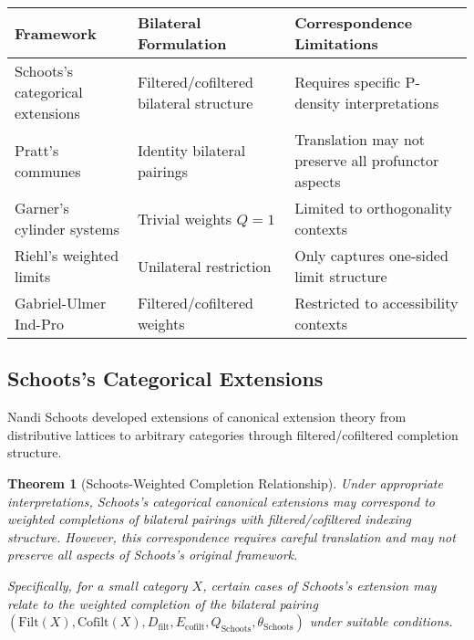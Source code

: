 \documentclass[11pt]{article}
\theoremstyle{plain}
\newtheorem{theorem}{Theorem}[section]
\theoremstyle{definition}
\theoremstyle{remark}
\begin{document}
\begin{center}
\renewcommand{\arraystretch}{1.4}
\begin{longtable}{@{}p{3.5cm}p{3.5cm}p{7cm}@{}}
\toprule
\textbf{Framework} & \textbf{Bilateral Formulation} & \textbf{Correspondence Limitations} \\
\midrule
Schoots's categorical extensions \cite{schoots2015generalising} & Filtered/cofiltered bilateral structure & Requires specific P-density interpretations \\
\addlinespace
Pratt's communes \cite{pratt2010communes} & Identity bilateral pairings & Translation may not preserve all profunctor aspects \\
\addlinespace
Garner's cylinder systems \cite{garner2018isbell} & Trivial weights $Q = 1$ & Limited to orthogonality contexts \\
\addlinespace
Riehl's weighted limits \cite{riehl2008weighted} & Unilateral restriction & Only captures one-sided limit structure \\
\addlinespace
Gabriel-Ulmer Ind-Pro \cite{gabriel1971lokal} & Filtered/cofiltered weights & Restricted to accessibility contexts \\
\bottomrule
\end{longtable}
\end{center}

\subsection{Schoots's Categorical Extensions}

Nandi Schoots \cite{schoots2015generalising} developed extensions of canonical extension theory from distributive lattices to arbitrary categories through filtered/cofiltered completion structure.

\begin{theorem}[Schoots-Weighted Completion Relationship]\label{thm:schoots-correspondence}
Under appropriate interpretations, Schoots's categorical canonical extensions may correspond to weighted completions of bilateral pairings with filtered/cofiltered indexing structure. However, this correspondence requires careful translation and may not preserve all aspects of Schoots's original framework.

Specifically, for a small category $X$, certain cases of Schoots's extension may relate to the weighted completion of the bilateral pairing $(\text{Filt}(X), \text{Cofilt}(X), D_{\text{filt}}, E_{\text{cofilt}}, Q_{\text{Schoots}}, \theta_{\text{Schoots}})$ under suitable conditions.
\end{theorem}
\end{document}
